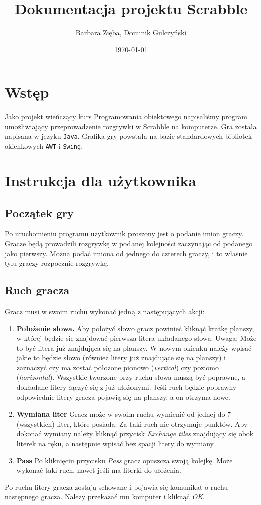 \documentclass[a4paper]{article}
\author{Barbara Zięba, Dominik Gulczyński}
\title{Dokumentacja projektu Scrabble}
\date{\today}
\begin{document}
\maketitle
\section{Wstęp}
Jako projekt wieńczący kurs Programowania obiektowego napisaliśmy
program umożliwiający przeprowadzenie rozgrywki w Scrabble na
komputerze.
Gra została napisana w języku \texttt{Java}.
Grafika gry powstała na bazie standardowych bibliotek okienkowych \texttt{AWT} i \texttt{Swing}.
\section{Instrukcja dla użytkownika}
\subsection{Początek gry}
Po uruchomieniu programu użytkownik proszony jest o podanie imion graczy.
Gracze będą prowadzili rozgrywkę w podanej kolejności zaczynając od podanego jako pierwszy.
Można podać imiona od jednego do czterech graczy, i to własnie tylu graczy rozpocznie rozgrywkę.
\subsection{Ruch gracza}
Gracz musi w swoim ruchu wykonać jedną z następujących akcji:
\begin{enumerate}
\item[] \textbf{Położenie słowa.} 
Aby położyć słowo gracz powinieć kliknąć kratkę planszy, w której będzie się znajdować pierwsza litera układanego słowa. 
Uwaga: Może to być litera już znajdująca się na planszy.
W nowym okienku należy wpisać jakie to będzie słowo (również litery już znajdujące się na planszy)
i zaznaczyć czy ma zostać położone pionowo (\textit{vertical}) czy poziomo (\textit{horizontal}).
Wszystkie tworzone przy ruchu słowa muszą być poprawne, a dokładane litery łączyć się z już ułożonymi.
Jeśli ruch będzie poprawny odpowiednie litery gracza pojawią się na planszy, a on otrzyma nowe.
\item[] \textbf{Wymiana liter}
Gracz może w swoim ruchu wymienić od jednej do 7 (wszystkich) liter, które posiada.
Za taki ruch nie otrzymuje punktów. 
Aby dokonać wymiany należy kliknąć przycisk \textit{Exchange tiles} znajdujący się obok literek na ręku, a następnie wpisać bez spacji litery do wymiany.
\item[] \textbf{Pass}
Po kliknięciu przycisku \textit{Pass} gracz opuszcza swoją kolejkę.
Może wykonać taki ruch, nawet jeśli ma literki do ułożenia.
\end{enumerate}
Po ruchu litery gracza zostają schowane i pojawia się komunikat o ruchu następnego gracza.
Należy przekazać mu komputer i kliknąć \textit{OK}.
\end{document}
